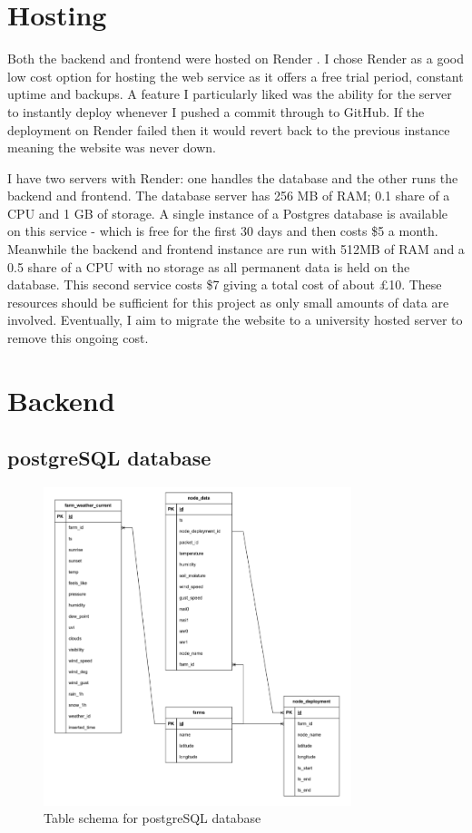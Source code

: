 \section{Hosting}

Both the backend and frontend were hosted on Render \cite{render}. I chose
Render as a good low cost option for hosting the web service as it offers a free
trial period, constant uptime and backups. A feature I particularly liked was
the ability for the server to instantly deploy whenever I pushed a commit
through to GitHub. If the deployment on Render failed then it would revert back
to the previous instance meaning the website was never down.

I have two servers with Render: one handles the database and the other runs the
backend and frontend. The database server has 256 MB of RAM; 0.1 share of a CPU
and 1 GB of storage. A single instance of a Postgres database is available on
this service - which is free for the first 30 days and then costs \$5 a month.
Meanwhile the backend and frontend instance are run with 512MB of RAM and a 0.5
share of a CPU with no storage as all permanent data is held on the database.
This second service costs \$7 giving a total cost of about £10. These resources
should be sufficient for this project as only small amounts of data are
involved. Eventually, I aim to migrate the website to a university hosted server
to remove this ongoing cost.

\section{Backend}

\subsection{postgreSQL database}\label{sec:database}

\begin{figure}[H]
    \centering
    \includegraphics[width=0.8\textwidth]{contents/part-3/fig3/postgres_diagram.png}
    \caption{Table schema for postgreSQL database}
    \label{fig:db_schema}
\end{figure}

